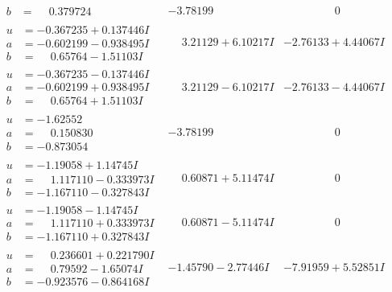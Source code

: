 \documentclass[1p]{elsarticle_modified}
\theoremstyle{definition}
\begin{document}
$$\begin{array}{c|c|c}
\begin{aligned}
b &= \phantom{-}0.379724\phantom{ +0.000000I}\end{aligned}
 & -3.78199\phantom{ +0.000000I} & \phantom{-0.000000 } 0 \\ \hline\begin{aligned}
u &= -0.367235 + 0.137446 I \\
a &= -0.602199 - 0.938495 I \\
b &= \phantom{-}0.65764 - 1.51103 I\end{aligned}
 & \phantom{-}3.21129 + 6.10217 I & -2.76133 + 4.44067 I \\ \hline\begin{aligned}
u &= -0.367235 - 0.137446 I \\
a &= -0.602199 + 0.938495 I \\
b &= \phantom{-}0.65764 + 1.51103 I\end{aligned}
 & \phantom{-}3.21129 - 6.10217 I & -2.76133 - 4.44067 I \\ \hline\begin{aligned}
u &= -1.62552\phantom{ +0.000000I} \\
a &= \phantom{-}0.150830\phantom{ +0.000000I} \\
b &= -0.873054\phantom{ +0.000000I}\end{aligned}
 & -3.78199\phantom{ +0.000000I} & \phantom{-0.000000 } 0 \\ \hline\begin{aligned}
u &= -1.19058 + 1.14745 I \\
a &= \phantom{-}1.117110 - 0.333973 I \\
b &= -1.167110 - 0.327843 I\end{aligned}
 & \phantom{-}0.60871 + 5.11474 I & \phantom{-0.000000 } 0 \\ \hline\begin{aligned}
u &= -1.19058 - 1.14745 I \\
a &= \phantom{-}1.117110 + 0.333973 I \\
b &= -1.167110 + 0.327843 I\end{aligned}
 & \phantom{-}0.60871 - 5.11474 I & \phantom{-0.000000 } 0 \\ \hline\begin{aligned}
u &= \phantom{-}0.236601 + 0.221790 I \\
a &= \phantom{-}0.79592 - 1.65074 I \\
b &= -0.923576 - 0.864168 I\end{aligned}
 & -1.45790 - 2.77446 I & -7.91959 + 5.52851 I \\ \hline\begin{aligned}

\end{aligned}
\end{array}$$
\end{document}
